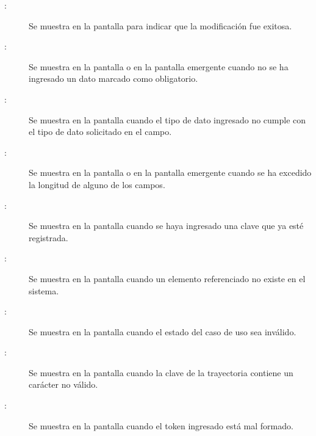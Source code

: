 	
\begin{description}
	\item[ :] Se muestra en la pantalla  para indicar que la modificación fue exitosa.
	\item[:] Se muestra en la pantalla  o en la pantalla emergente  cuando no se ha ingresado un dato marcado como obligatorio.
	\item[:] Se muestra en la pantalla  cuando el tipo de dato ingresado no cumple con el tipo de dato solicitado en el campo.
	\item[:] Se muestra en la pantalla  o en la pantalla emergente  cuando se ha excedido la longitud de alguno de los campos.
	\item[:] Se muestra en la pantalla  cuando se haya ingresado una clave que ya esté registrada.
	\item[:] Se muestra en la pantalla  cuando un elemento referenciado no existe en el sistema.
	\item[:] Se muestra en la pantalla  cuando el estado del caso de uso sea inválido.
	\item[:] Se muestra en la pantalla  cuando la clave de la trayectoria contiene un carácter no válido.
	\item[:] Se muestra en la pantalla  cuando el token ingresado está mal formado.
\end{description}
